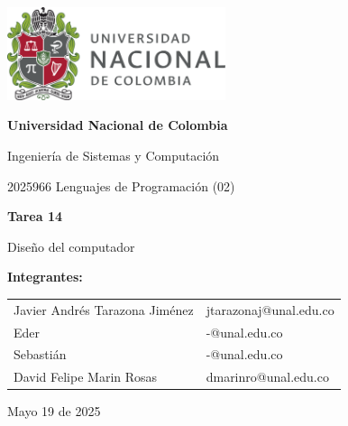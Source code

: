 \documentclass{article}
\begin{document}
\begin{titlepage}
  \centering
  \includegraphics[width=0.48\textwidth]{logo_universidad.png}
  \par\vspace{2cm}

  {\Large \textbf{Universidad Nacional de Colombia} \par}
  \vspace{0.5cm}
  {\large Ingeniería de Sistemas y Computación \par}
  {\large 2025966 Lenguajes de Programación (02)\par}
  \vspace{3cm}

  {\large \textbf{Tarea 14} \par}
  {\large Diseño del computador\par}
  \vspace{3cm}

  {\large \textbf{Integrantes:} \par}
  \vspace{0.5cm}
  \begin{tabular}{ll}
    Javier Andrés Tarazona Jiménez & jtarazonaj@unal.edu.co \\
    Eder                           & -@unal.edu.co          \\
    Sebastián                      & -@unal.edu.co          \\
    David Felipe Marin Rosas       & dmarinro@unal.edu.co   \\
  \end{tabular}
  \par\vspace{3cm}

  {\large Mayo 19 de 2025 \par}
\end{titlepage}

\tableofcontents %

\newpage %
\end{document}
